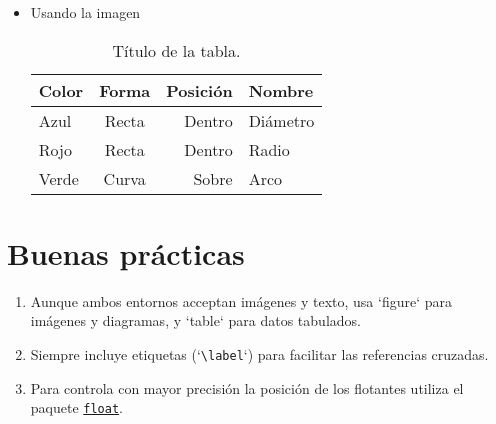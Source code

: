 \begin{itemize}
    \item Usando la imagen 
    \begin{codigo}
    \begin{LTXexample}[numbers=none]
        \begin{table}[h]
            \centering
            \begin{tabular}{lcrp{3cm}}
            \toprule
            Color & Forma & Posición & Nombre \\ \midrule
            Azul & Recta & Dentro & Diámetro\\ 
            Rojo & Recta & Dentro & Radio\\
            Verde & Curva & Sobre & Arco\\
            \bottomrule
            \end{tabular} 
        \caption{Título de la tabla.}
        \label{tabla:unatabla}
        \end{table}
    \end{LTXexample}
    \label{ejemplo:table}
    \end{codigo}

\end{itemize}

\section{Buenas prácticas}
\begin{enumerate}
    \item Aunque  ambos entornos acceptan imágenes y texto, usa `figure` para imágenes y diagramas, y `table` para datos tabulados.
    \item Siempre incluye etiquetas (`\verb|\label|`) para facilitar las referencias cruzadas.
    \item Para controla con mayor precisión la posición de los flotantes utiliza el paquete \hyperref[ch:float]{\texttt{float}}.
\end{enumerate}



